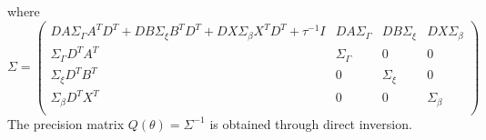 \documentclass[ba]{imsart}
\begin{document}
where
\begin{equation*}
\Sigma = \begin{pmatrix}
DA\Sigma_{\Gamma}A^{T}D^{T} + DB\Sigma_{\xi}B^{T}D^{T} + DX\Sigma_{\beta}X^{T}D^{T} + \tau^{-1}I & DA\Sigma_{\Gamma} & DB\Sigma_{\xi} & DX\Sigma_{\beta} \\
\Sigma_{\Gamma}D^{T}A^{T} & \Sigma_{\Gamma} & 0 & 0 \\
\Sigma_{\xi}D^{T}B^{T} & 0 & \Sigma_{\xi} & 0 \\
\Sigma_{\beta}D^{T}X^{T} & 0 & 0 & \Sigma_{\beta} \\
\end{pmatrix}
\end{equation*}
The precision matrix $Q(\theta) = \Sigma^{-1}$ is obtained through direct inversion.


\nocite{*}%

%

\clearpage
\end{document}
